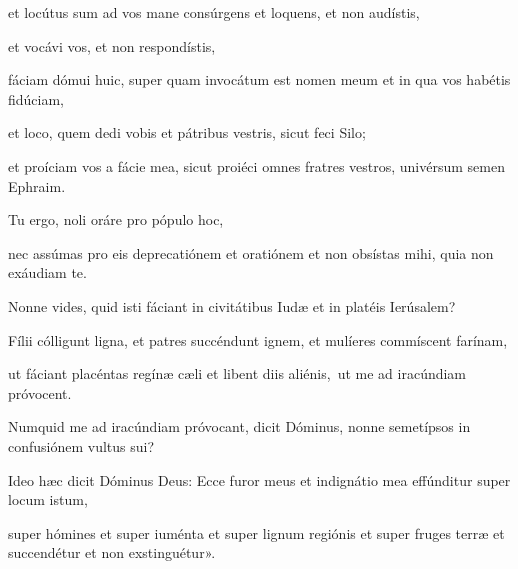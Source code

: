 {\noindent et locútus sum ad vos mane consúrgens et loquens, et non audístis,

\noindent et vocávi vos, et non respondístis,

\noindent fáciam dómui huic, super quam invocátum est nomen meum et in qua vos habétis fidúciam,

\noindent et loco, quem dedi vobis et pátribus vestris, sicut feci Silo;

\noindent et proíciam vos a fácie mea, sicut proiéci omnes fratres vestros, univérsum semen Ephraim.

\noindent Tu ergo, noli oráre pro pópulo hoc,

\noindent nec assúmas pro eis deprecatiónem et oratiónem et non obsístas mihi, quia non exáudiam te.

\noindent Nonne vides, quid isti fáciant in civitátibus Iudæ et in platéis Ierúsalem?

\noindent Fílii cólligunt ligna, et patres succéndunt ignem, et mulíeres commíscent farínam,

\noindent ut fáciant placéntas regínæ cæli et libent diis aliénis, ut me ad iracúndiam próvocent.

\noindent Numquid me ad iracúndiam próvocant, dicit Dóminus, nonne semetípsos in confusiónem vultus sui?

\noindent Ideo hæc dicit Dóminus Deus: Ecce furor meus et indignátio mea effúnditur super locum istum,

\noindent super hómines et super iuménta et super lignum regiónis et super fruges terræ et succendétur et non exstinguétur».}
\newcommand{\responsoriumi}{\pars{Responsorium 1.} \scriptura{\Rbardot{} Ion. 2, 4-5 \Vbardot{} ibid., 6; \textbf{H418}}

\vspace{-5mm}

\responsorium{VII}{temporalia/resp-fluctustuisuperme-CROCHU.gtex}{}

\rubrica{vel ad libitum:}

\vspace{3mm}

\pars{Responsorium 1.} \scriptura{\Rbardot{} Iob 20, 27 \Vbardot{} Ps. 68, 23; \textbf{H182}}

\vspace{-5mm}

\responsorium{I}{temporalia/resp-revelabuntcaeli-CROCHU.gtex}{}}
